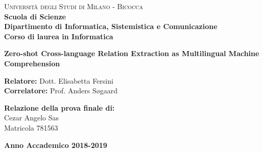 \documentclass[a4paper,12pt, openright, oneside]{book}
\begin{document}
\begin{titlepage}
    \noindent
    \begin{minipage}[t]{0.19\textwidth}
    \end{minipage}
    \begin{minipage}[t]{0.81\textwidth}
    {
            {\textsc{Università degli Studi di Milano - Bicocca}} \\
            \textbf{Scuola di Scienze} \\
            \textbf{Dipartimento di Informatica, Sistemistica e Comunicazione} \\
            \textbf{Corso di laurea in Informatica} \\
            \par
    }
    \end{minipage}
    
\vspace{40mm}
    
\begin{center}
        {\LARGE{
                \textbf{Zero-shot Cross-language Relation Extraction as Multilingual Machine Comprehension}
                \par
        }}
    \end{center}
    
    \vspace{40mm}

    \noindent
    {\large \textbf{Relatore:} Dott. Elisabetta Fersini} \\

    \noindent
    {\large \textbf{Correlatore:} Prof. Anders S{\o}gaard}
        
    \vspace{15mm}

    \begin{flushright}
        {\large \textbf{Relazione della prova finale di:}} \\
        \large{Cezar Angelo Sas} \\
        \large{Matricola 781563} 
    \end{flushright}
        
    \vspace{40mm}
    \begin{center}
        {\large{\bf Anno Accademico 2018-2019}}
    \end{center}

    \restoregeometry
        
\end{titlepage}
\end{document}
